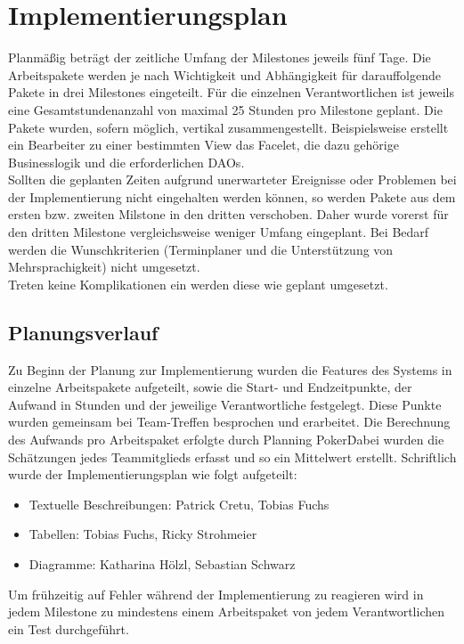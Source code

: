 \newcommand{\kursiv}[1]{{\it #1}}
\chapter{Implementierungsplan}
Planmäßig beträgt der zeitliche Umfang der Milestones jeweils fünf Tage. Die Arbeitspakete werden
je nach Wichtigkeit und Abhängigkeit für darauffolgende Pakete in drei Milestones eingeteilt. Für die einzelnen Verantwortlichen ist jeweils eine Gesamtstundenanzahl von maximal 25 Stunden pro Milestone geplant. Die Pakete wurden, sofern möglich, vertikal zusammengestellt.
Beispielsweise erstellt ein Bearbeiter zu einer bestimmten View das Facelet, die dazu
gehörige Businesslogik und die erforderlichen DAOs.\\
Sollten die geplanten Zeiten aufgrund unerwarteter Ereignisse oder Problemen bei der Implementierung nicht eingehalten werden können, so werden Pakete aus dem
ersten bzw. zweiten Milstone in den dritten verschoben. Daher wurde vorerst für den dritten Milestone vergleichsweise weniger Umfang eingeplant.
Bei Bedarf werden die Wunschkriterien (Terminplaner und die Unterstützung von Mehrsprachigkeit) nicht umgesetzt.\\
Treten keine Komplikationen ein werden diese wie geplant umgesetzt.

\section{Planungsverlauf}
Zu Beginn der Planung zur Implementierung wurden die Features des Systems in einzelne Arbeitspakete aufgeteilt, sowie die Start- und Endzeitpunkte, der Aufwand in Stunden und der jeweilige Verantwortliche festgelegt. Diese Punkte wurden gemeinsam bei Team-Treffen besprochen und erarbeitet. Die Berechnung des Aufwands pro Arbeitspaket erfolgte durch \grqq Planning Poker\grqq\. Dabei wurden die Schätzungen jedes Teammitglieds erfasst und so ein Mittelwert erstellt.
Schriftlich wurde der Implementierungsplan wie folgt aufgeteilt:

\begin{itemize}
\item Textuelle Beschreibungen: Patrick Cretu, Tobias Fuchs
\item Tabellen: Tobias Fuchs, Ricky Strohmeier
\item Diagramme: Katharina Hölzl, Sebastian Schwarz
\end{itemize}

Um frühzeitig auf Fehler während der Implementierung zu reagieren wird in jedem Milestone zu mindestens einem Arbeitspaket von jedem Verantwortlichen ein Test durchgeführt.

